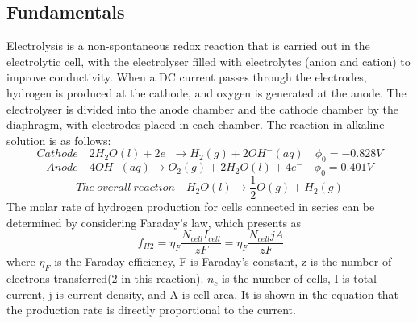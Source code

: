 \subsection{Fundamentals} 
Electrolysis is a non-spontaneous redox reaction that is carried out in the electrolytic cell, with the electrolyser filled with electrolytes (anion and cation) to improve conductivity. When a DC current passes through the electrodes, hydrogen is produced at the cathode, and oxygen is generated at the anode. The electrolyser is divided into the anode chamber and the cathode chamber by the diaphragm, with electrodes placed in each chamber. The reaction in alkaline solution is as follows:
\begin{equation} 
Cathode \quad 2H_2 O(l) + 2e^- \rightarrow H_2(g) + 2OH^-(aq)\quad   \phi_0=-0.828V
\end{equation} 
\begin{equation} 
Anode \quad 4OH^-(aq) \rightarrow O_2(g) +2H_2O(l) +4e^- \quad \phi_0=0.401V
\end{equation} 
\begin{equation} 
The \ overall \ reaction \quad H_2O(l) \rightarrow \frac{1}{2} O(g) + H_2(g) 
\end{equation} 
The molar rate of hydrogen production for cells connected in series can be determined by considering Faraday's law, which presents as\cite{gibbs} 
\begin{equation} 
\ f_{H2} = \eta_F \frac{N_{cell}I_{cell}}{zF} =\eta_F\frac{N_{cell} jA}{zF} 
\end{equation} 
where $\eta_F$ is the Faraday efficiency, F is Faraday's constant, z is the number of electrons transferred(2 in this reaction). $n_c$ is the number of cells, I is total current, j is current density, and A is cell area. It is shown in the equation that the production rate is directly proportional to the current.

